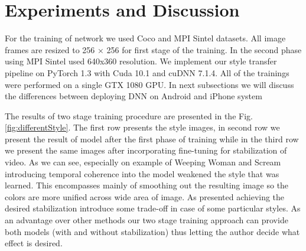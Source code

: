 \documentclass[a4paper,conference]{IEEEtran}
\begin{document}
\section{Experiments and Discussion}


For the training of network we used Coco \cite{cocoDataset} and MPI Sintel \cite{Mpi_sintel}  datasets. All image frames are resized to 256 × 256 for first stage of the training. In the second phase using MPI Sintel used 640x360 resolution. We implement our style transfer pipeline on PyTorch 1.3  with Cuda 10.1 and cuDNN 7.1.4. All of the trainings were performed on a single GTX 1080 GPU. In next subsections we will discuss the differences between deploying DNN on Android and iPhone system 




The results of two stage training procedure are presented in the Fig. \ref{fig:differentStyle}. The first row presents the style images, in second row we present the result of model after the first phase of training while in the third row we present the same images after incorporating fine-tuning for stabilization of video. As we can see, especially on example of Weeping Woman and Scream introducing temporal coherence into the model weakened the style that was learned. This encompasses mainly of smoothing out the resulting image so the colors are more unified across wide area of image. As presented achieving the desired stabilization introduce some trade-off in case of some particular styles. As an advantage over other methods our two stage training approach can provide both models (with and without stabilization) thus letting the author decide what effect is desired.
\end{document}
